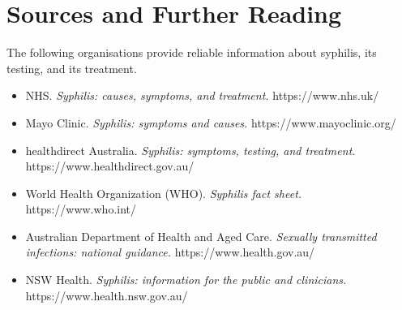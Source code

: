 \section*{Sources and Further Reading}
The following organisations provide reliable information about syphilis, its testing, and its treatment.

\begin{itemize}
    \item NHS. \textit{Syphilis: causes, symptoms, and treatment.} https://www.nhs.uk/
    \item Mayo Clinic. \textit{Syphilis: symptoms and causes.} https://www.mayoclinic.org/
    \item healthdirect Australia. \textit{Syphilis: symptoms, testing, and treatment.} https://www.healthdirect.gov.au/
    \item World Health Organization (WHO). \textit{Syphilis fact sheet.} https://www.who.int/
    \item Australian Department of Health and Aged Care. \textit{Sexually transmitted infections: national guidance.} https://www.health.gov.au/
    \item NSW Health. \textit{Syphilis: information for the public and clinicians.} https://www.health.nsw.gov.au/
\end{itemize}
\clearpage
